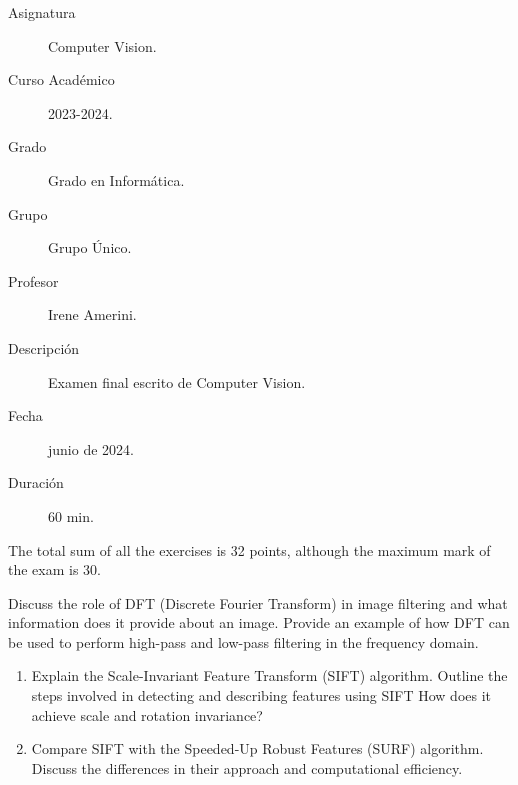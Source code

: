 \documentclass[12pt]{article}
\begin{document}

    
	

    \begin{description}
        \item[Asignatura] Computer Vision.
        \item[Curso Académico] 2023-2024.
        \item[Grado] Grado en Informática.
        \item[Grupo] Grupo Único.
        \item[Profesor] Irene Amerini.
        \item[Descripción] Examen final escrito de Computer Vision.
        \item[Fecha] junio de 2024.
        \item[Duración] 60 min.
    
    \end{description}
    \newpage


    \begin{observacion}
        The total sum of all the exercises is 32 points, although the maximum mark of the exam is 30.
    \end{observacion}
    \begin{ejercicio}[8 points]
    Discuss the role of DFT (Discrete Fourier Transform) in image filtering and what information does it provide about an image. Provide an example of how DFT can be used to perform high-pass and low-pass filtering in the frequency domain.
    \end{ejercicio}

    \begin{ejercicio}[8 points]
        \begin{enumerate}
            \item[a.] Explain the Scale-Invariant Feature Transform (SIFT) algorithm. Outline the steps involved in detecting and describing features using SIFT How does it achieve scale and rotation invariance?
            \item[b.] Compare SIFT with the Speeded-Up Robust Features (SURF) algorithm. Discuss the differences in their approach and computational efficiency.
        \end{enumerate}
    \end{ejercicio}
\end{document}
